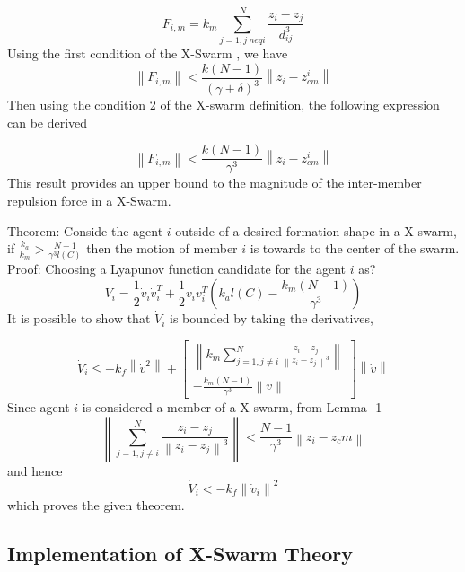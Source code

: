 \documentclass[twoside]{article}
\newcommand{\norm}[1]{\left\lVert#1\right\rVert}
\begin{document}
\begin{equation}
 F_{i,m} = k_m \sum_{j=1, j\ neq i}^{N} \frac{z_i - z_j}{d_{ij}^3} 
\end{equation}
Using the first condition of the X-Swarm , we have
\begin{equation}
 \norm{F_{i,m}} < \frac{k(N-1)}{(\gamma + \delta)^3} \norm{z_i - z_{cm}^i}
\end{equation}
Then using the condition 2 of the X-swarm definition, the following expression can be derived

\begin{equation}
 \norm{F_{i,m}} < \frac{k(N-1)}{\gamma^3} \norm{z_i - z_{cm}^i}
\end{equation}
		This result provides an upper bound to the magnitude of the inter-member repulsion force in a X-Swarm.  
		
		Theorem: Conside the agent $i$	outside of a desired formation shape in a X-swarm, if $\frac{k_a}{k_m} > \frac{N-1}{\gamma^3  l(C)}$ then the motion of member $i$ is towards to the center of the swarm. 
		Proof: Choosing a Lyapunov function candidate for the agent $i$ as?
		\begin{equation}
      V_i = \frac{1}{2} \dot{v}_i \dot{v}_i^T + \frac{1}{2} v_i v_i^T\left(k_al(C)-\frac{k_m(N-1)}{\gamma^3}\right) 
      		\end{equation}
			It is possible to show that $\dot{V}_i$ is bounded by taking the derivatives,
			
			\begin{equation}
\dot{V}_i \leq -k_f \norm{\dot{v}^2} + \begin{bmatrix}
\norm{k_m \sum_{j=1, j \neq i}^{N} \frac{z_i - z_j}{\norm{z_i - z_j}^3}} \\
- \frac{k_m(N-1)}{\gamma ^3} \norm{v}
\end{bmatrix} \norm{\dot{v}}
			\end{equation}
			Since agent $i$ is considered a member of a X-swarm, from Lemma -1
			\begin{equation}
\norm{ \sum_{j=1, j \neq i}^{N} \frac{z_i - z_j}{\norm{z_i - z_j}^3}} < \frac{N-1}{\gamma^3} \norm{z_i - z_cm}
			\end{equation}
			and hence
			\begin{equation}
\dot{V}_i < -k_f \norm{\dot{v}_i} ^2
			\end{equation}
			which proves the given theorem. 
\subsection{Implementation of X-Swarm Theory}			
\end{document}
